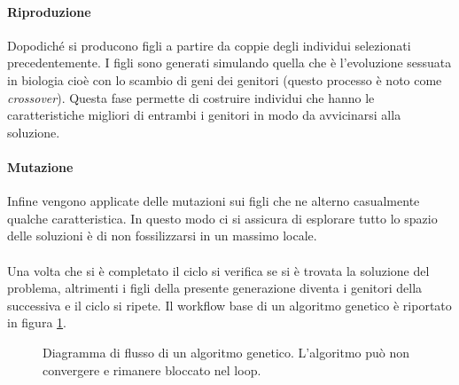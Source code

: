 \documentclass[italian,twoside,twocolumn]{article}
\begin{document}
\paragraph{Riproduzione} Dopodiché si producono figli a partire da coppie degli individui selezionati precedentemente. I figli sono generati simulando quella che è l'evoluzione sessuata in biologia cioè con lo scambio di geni dei genitori (questo processo è noto come \emph{crossover}). Questa fase permette di costruire individui che hanno le caratteristiche migliori di entrambi i genitori in modo da avvicinarsi alla soluzione.

\paragraph{Mutazione} Infine vengono applicate delle mutazioni sui figli che ne alterno casualmente qualche caratteristica. In questo modo ci si assicura di esplorare tutto lo spazio delle soluzioni è di non fossilizzarsi in un massimo locale.
\\ \\
Una volta che si è completato il ciclo si verifica se si è trovata la soluzione del problema, altrimenti i figli della presente generazione diventa i genitori della successiva e il ciclo si ripete. Il workflow base di un algoritmo genetico è riportato in figura \ref*{fig:workflow_genetic}. 
\begin{figure}[htbp]
	\centering
	\caption{Diagramma di flusso di un algoritmo genetico. L'algoritmo può non convergere e rimanere bloccato nel loop. }
	\label{fig:workflow_genetic}
\end{figure}
\end{document}
